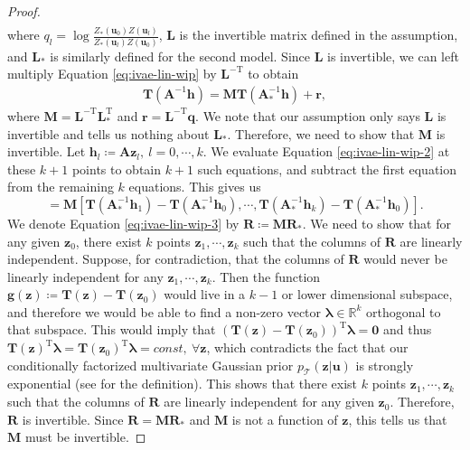 \documentclass[10pt]{article} %
\theoremstyle{plain}
\theoremstyle{definition}
\begin{document}
\begin{proof}
\begin{align}
    \end{align}
    where $q_l=\log \frac{Z_*(\mathbf{u}_0)Z(\mathbf{u}_l)}{Z_*(\mathbf{u}_l)Z(\mathbf{u}_0)}$, $\mathbf{L}$ is the invertible matrix defined in the assumption, and $\mathbf{L}_{*}$ is similarly defined for the second model. Since $\mathbf{L}$ is invertible, we can left multiply Equation \eqref{eq:ivae-lin-wip} by $\mathbf{L}^{-\text{T}}$ to obtain
    \begin{align}
        \mathbf{T}(\mathbf{A}^{-1}\mathbf{h})=\mathbf{M}\mathbf{T}(\mathbf{A}_{*}^{-1}\mathbf{h}) +\mathbf{r},\label{eq:ivae-lin-wip-2}
    \end{align}
    where $\mathbf{M}=\mathbf{L}^{-\text{T}}\mathbf{L}_{*}^{\text{T}}$ and $\mathbf{r}=\mathbf{L}^{-\text{T}}\mathbf{q}$. We note that our assumption only says $\mathbf{L}$ is invertible and tells us nothing about $\mathbf{L}_{*}$. Therefore, we need to show that $\mathbf{M}$ is invertible.
    Let $\mathbf{h}_l\coloneqq\mathbf{A}\mathbf{z}_l,~l=0,\cdots,k$. We evaluate Equation \eqref{eq:ivae-lin-wip-2} at these $k+1$ points to obtain $k+1$ such equations, and subtract the first equation from the remaining $k$ equations. This gives us
    \begin{equation}
        [\mathbf{T}(\mathbf{z}_1)-\mathbf{T}(\mathbf{z}_0),\cdots,\mathbf{T}(\mathbf{z}_k)-\mathbf{T}(\mathbf{z}_0)]=\mathbf{M}[\mathbf{T}(\mathbf{A}_{*}^{-1}\mathbf{h}_1)-\mathbf{T}(\mathbf{A}_{*}^{-1}\mathbf{h}_0),\cdots,\mathbf{T}(\mathbf{A}_{*}^{-1}\mathbf{h}_k)-\mathbf{T}(\mathbf{A}_{*}^{-1}\mathbf{h}_0)].\label{eq:ivae-lin-wip-3}
    \end{equation}
    We denote Equation \eqref{eq:ivae-lin-wip-3} by $\mathbf{R}\coloneqq\mathbf{M}\mathbf{R}_{*}$. We need to show that for any given $\mathbf{z}_0$, there exist $k$ points $\mathbf{z}_1,\cdots,\mathbf{z}_k$ such that the columns of $\mathbf{R}$ are linearly independent. Suppose, for contradiction, that the columns of $\mathbf{R}$ would never be linearly independent for any $\mathbf{z}_1,\cdots,\mathbf{z}_k$. Then the function $\mathbf{g}(\mathbf{z})\coloneqq\mathbf{T}(\mathbf{z})-\mathbf{T}(\mathbf{z}_0)$ would live in a $k-1$ or lower dimensional subspace, and therefore we would be able to find a non-zero vector $\boldsymbol{\lambda}\in\mathbb{R}^k$ orthogonal to that subspace. This would imply that $(\mathbf{T}(\mathbf{z})-\mathbf{T}(\mathbf{z}_0))^{\text{T}}\boldsymbol{\lambda}=\mathbf{0}$ and thus $\mathbf{T}(\mathbf{z})^{\text{T}}\boldsymbol{\lambda}=\mathbf{T}(\mathbf{z}_0)^{\text{T}}\boldsymbol{\lambda}=const,~\forall\mathbf{z}$, which contradicts the fact that our conditionally factorized multivariate Gaussian prior $p_{\mathcal{T}}(\mathbf{z}|\mathbf{u})$ is strongly exponential (see \citet{Khemakhem_Kingma_Monti_Hyvarinen_2020} for the definition). This shows that there exist $k$ points $\mathbf{z}_1,\cdots,\mathbf{z}_k$ such that the columns of $\mathbf{R}$ are linearly independent for any given $\mathbf{z}_0$. Therefore, $\mathbf{R}$ is invertible. Since $\mathbf{R}=\mathbf{M}\mathbf{R}_{*}$ and $\mathbf{M}$ is not a function of $\mathbf{z}$, this tells us that $\mathbf{M}$ must be invertible.
    

\end{proof}
\end{document}

